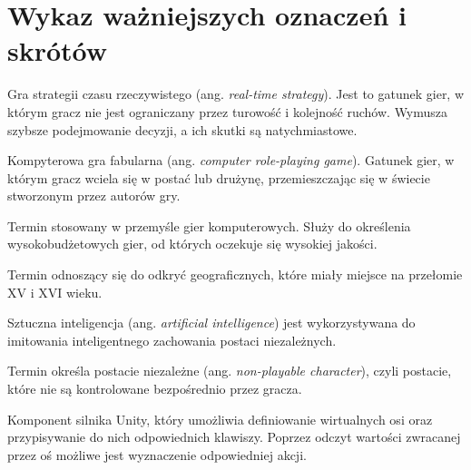 \chapter*{Wykaz ważniejszych oznaczeń i skrótów}
\begin{description}[style=multiline,leftmargin=3cm]
\item[RTS] Gra strategii czasu rzeczywistego (ang. \textit{real-time strategy}). Jest to gatunek gier, w którym gracz nie jest
ograniczany przez turowość i kolejność ruchów. Wymusza szybsze podejmowanie decyzji, a ich skutki są natychmiastowe.
\item[cRPG] Kompyterowa gra fabularna (ang. \textit{computer role-playing game}). Gatunek gier, w którym gracz wciela
się w postać lub drużynę, przemieszczając się w świecie stworzonym przez autorów gry.
\item[AAA (Triple-A)] Termin stosowany w przemyśle gier komputerowych. Służy do określenia wysokobudżetowych gier, od
których oczekuje się wysokiej jakości.
\item[Wielkie odkrycia geograficzne] Termin odnoszący się do odkryć geograficznych, które miały miejsce na przełomie XV
i XVI wieku.
\item[AI] Sztuczna inteligencja (ang. \textit{artificial intelligence}) jest wykorzystywana do imitowania inteligentnego
zachowania postaci niezależnych.
\item[NPC] Termin określa postacie niezależne (ang. \textit{non-playable character}), czyli postacie, które nie są kontrolowane bezpośrednio
przez gracza.
\item[Input Manager] Komponent silnika Unity, który umożliwia definiowanie wirtualnych osi oraz przypisywanie do nich
odpowiednich klawiszy. Poprzez odczyt wartości zwracanej przez oś możliwe jest wyznaczenie odpowiedniej akcji.
\end{description}
